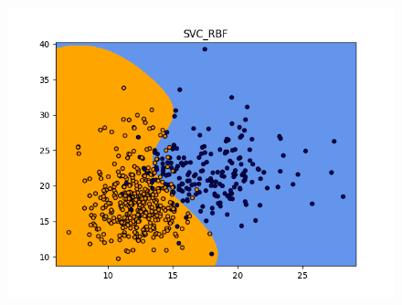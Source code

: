 \documentclass[xcolor=dvipsnames,xcolor=table]{beamer} %
\begin{document}
\begin{frame}
\begin{figure}[!htb]
		\includegraphics[width=1\linewidth]{PROYECTO/imgs/metodos/6_SupportVectorMachinesRBF}
		\endminipage\hfill
	\end{figure}
	
\end{frame}
\end{document}
